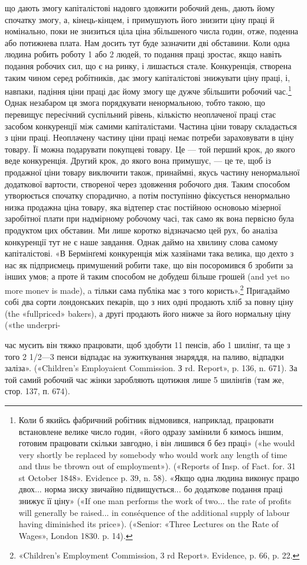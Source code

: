 що дають змогу капіталістові надовго здовжити робочий день,
дають йому спочатку змогу, а, кінець-кінцем, і примушують
його знизити ціну праці й номінально, поки не знизиться ціла ціна
збільшеного числа годин, отже, поденна або потижнева плата.
Нам досить тут буде зазначити дві обставини. Коли одна людина
робить роботу 1 або 2 людей, то подання праці зростає, якщо
навіть подання робочих сил, що є на ринку, і лишається стале.
Конкуренція, створена таким чином серед робітників, дає змогу
капіталістові знижувати ціну праці, і, навпаки, падіння ціни
праці дає йому змогу ще дужче збільшити робочий час.\footnote{
Коли б якийсь фабричний робітник відмовився, наприклад, працювати
встановлене велике число годин, «його одразу замінили б кимось
іншим, готовим працювати скільки завгодно, і він лишився б без праці»
(«he would very shortly be replaced by somebody who would work any
length of time and thus be tbrown out of employment»). («Reports of Insp.
of Fact. for. 31 st October 1848». Evidence p. 39, n. 58). «Якщо одна людина
виконує працю двох... норма зиску звичайно підвищується... бо додаткове
подання праці знижує її ціну» («If one man performs the work of
two... the rate of profits will generally be raised... in conséquence of the
additional supply of labour having diminished its price»). («Senior:
«Three Lectures on the Rate of Wages», London 1830. p. 14).
} Однак
незабаром ця змога порядкувати ненормальною, тобто такою,
що перевищує пересічний суспільний рівень, кількістю неоплаченої
праці стає засобом конкуренції між самими капіталістами.
Частина ціни товару складається з ціни праці. Неоплачену частину
ціни праці немає потреби зараховувати в ціну товару.
Її можна подарувати покупцеві товару. Це — той перший крок,
до якого веде конкуренція. Другий крок, до якого вона примушує,
— це те, щоб із продажної ціни товару виключити також,
принаймні, якусь частину ненормальної додаткової вартости, створеної
через здовження робочого дня. Таким способом утворюється
спочатку спорадично, а потім поступінно фіксується ненормально
низка продажна ціна товару, яка відтепер стає постійною
основоью мізерної заробітної плати при надмірному
робочому часі, так само як вона первісно була продуктом цих
обставин. Ми лише коротко відзначаємо цей рух, бо аналіза конкуренції
тут не є наше завдання. Однак даймо на хвилину слова
самому капіталістові. «В Бермінґемі конкуренція між хазяїнами
така велика, що дехто з нас як підприємець примушений робити
таке, що він посоромився б зробити за інших умов; а проте й
таким способом не добудеш більше грошей (and yet no more
monev is made), a тільки сама публіка має з того користь».\footnote{
«Children’s Employment Commission, 3 rd Report». Evidence, p. 66, p. 22.
}
Пригадаймо собі два сорти лондонських пекарів, що з них одні
продають хліб за повну ціну (the «fullpriced» bakers), а другі
продають його нижче за його нормальну ціну («the underpri-

час мусить він тяжко працювати, щоб здобути 11 пенсів, або 1 шилінґ,
та ще з того 2 1/2—3 пенси відпадає на зужиткування знаряддя, на паливо,
відпадки заліза». («Children’s Employaient Commission. З rd. Report», p.
136, n. 671). За той самий робочий час жінки заробляють щотижня
лише 5 шилінґів (там же, стор. 137, п. 674).
